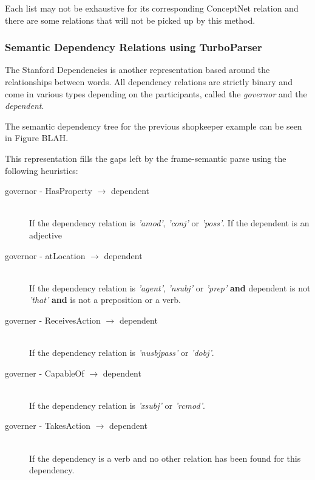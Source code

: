 Each list may not be exhaustive for its corresponding ConceptNet relation and there are some relations that will not be picked up by this method.


\subsubsection{Semantic Dependency Relations using TurboParser}
\label{sec:turbo}

The Stanford Dependencies is another representation based around the relationships between words. All dependency relations are strictly binary and come in various types depending on the participants, called the \textit{governor} and the \textit{dependent}.

The semantic dependency tree for the previous shopkeeper example can be seen in Figure BLAH.

This representation fills the gaps left by the frame-semantic parse using the following heuristics:

\begin{description}
\item[governor - HasProperty $\rightarrow$ dependent]  \hfill \\
If the dependency relation is \textit{'amod'}, \textit{'conj'} or \textit{'poss'}.
If the dependent is an adjective

\item[governor - atLocation $\rightarrow$ dependent] \hfill \\
If the dependency relation is \textit{'agent'}, \textit{'nsubj'} or \textit{'prep'}
	\textbf{and} dependent is not \textit{'that'} \textbf{and} is not a preposition or a verb.
	
\item[governer - ReceivesAction $\rightarrow$ dependent] \hfill \\
If the dependency relation is \textit{'nusbjpass'} or \textit{'dobj'}.

\item[governer - CapableOf $\rightarrow$ dependent] \hfill \\
If the dependency relation is \textit{'xsubj'} or \textit{'rcmod'}.

\item[governer - TakesAction $\rightarrow$ dependent] \hfill \\
If the dependency is a verb and no other relation has been found for this dependency.
\end{description}

